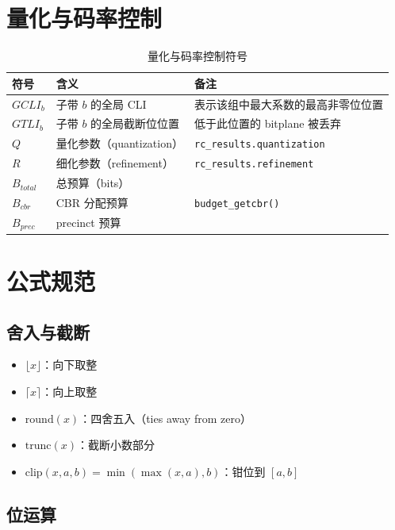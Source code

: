 \section{量化与码率控制}

\begin{table}[H]
\centering
\caption{量化与码率控制符号}
\label{tab:notation-quant}
\begin{tabular}{@{}lll@{}}
\toprule
符号 & 含义 & 备注 \\
\midrule
$GCLI_b$ & 子带 $b$ 的全局 CLI & 表示该组中最大系数的最高非零位位置 \\
$GTLI_b$ & 子带 $b$ 的全局截断位位置 & 低于此位置的 bitplane 被丢弃 \\
$Q$ & 量化参数（quantization） & \texttt{rc\_results.quantization} \\
$R$ & 细化参数（refinement） & \texttt{rc\_results.refinement} \\
$B_{total}$ & 总预算（bits） & \\
$B_{cbr}$ & CBR 分配预算 & \texttt{budget\_getcbr()} \\
$B_{prec}$ & precinct 预算 & \\
\bottomrule
\end{tabular}
\end{table}

\section{公式规范}

\subsection{舍入与截断}

\begin{itemize}
  \item $\lfloor x \rfloor$：向下取整
  \item $\lceil x \rceil$：向上取整
  \item $\mathrm{round}(x)$：四舍五入（ties away from zero）
  \item $\mathrm{trunc}(x)$：截断小数部分
  \item $\mathrm{clip}(x, a, b) = \min(\max(x, a), b)$：钳位到 $[a, b]$
\end{itemize}

\subsection{位运算}

